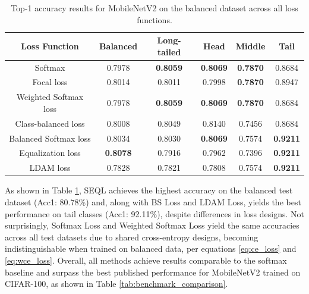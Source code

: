 \begin{table}[H]
    \centering
    \caption{Top-1 accuracy results for MobileNetV2 on the balanced dataset across all loss functions.}
    \small
    \begin{tabular}{cccccc}
        \toprule
        Loss Function & Balanced & Long-tailed & Head & Middle & Tail \\ 
        \midrule
        Softmax   & 0.7978   & \textbf{0.8059} & \textbf{0.8069} & \textbf{0.7870} & 0.8684 \\
        Focal loss   & 0.8014   & 0.8011 & 0.7998 & \textbf{0.7870} & 0.8947 \\
        Weighted Softmax loss   & 0.7978   & \textbf{0.8059} & \textbf{0.8069} & \textbf{0.7870} & 0.8684 \\
        Class-balanced loss   & 0.8008   & 0.8049 & 0.8140 & 0.7456 & 0.8684 \\
        Balanced Softmax loss   & 0.8034  & 0.8030 & \textbf{0.8069} & 0.7574 & \textbf{0.9211} \\
        Equalization loss   &  \textbf{0.8078}  & 0.7916 & 0.7962 & 0.7396 & \textbf{0.9211} \\
        LDAM loss   &  0.7828   & 0.7821 & 0.7808 & 0.7574 & \textbf{0.9211} \\
        \bottomrule
    \end{tabular}
    \label{tab:mobilenet_bal_acc1_1}
\end{table}

As shown in Table \ref{tab:mobilenet_bal_acc1_1}, SEQL achieves the highest accuracy on the balanced test dataset (Acc1: 80.78\%) and, along with BS Loss and LDAM Loss, yields the best performance on tail classes (Acc1: 92.11\%), despite differences in loss designs. Not surprisingly, Softmax Loss and Weighted Softmax Loss yield the same accuracies across all test datasets due to shared cross-entropy designs, becoming indistinguishable when trained on balanced data, per equations \eqref{eq:ce_loss} and \eqref{eq:wce_loss}. Overall, all methods achieve results comparable to the softmax baseline and surpass the best published performance for MobileNetV2 trained on CIFAR-100, as shown in Table \ref{tab:benchmark_comparison}.

